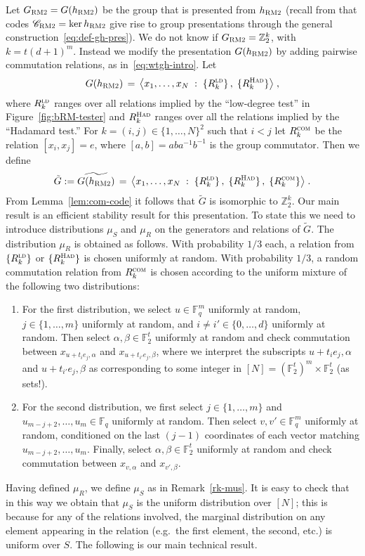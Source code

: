 \documentclass[11pt]{article}
\theoremstyle{definition}
\newcommand{\code}{\mathscr{C}}
\newcommand{\F}{\ensuremath{\mathbb{F}}}
\newcommand{\ld}{\textsc{ld}}
\newcommand{\com}{\textsc{com}}
\newcommand{\sq}{\textsc{sq}}
\newcommand{\Z}{\ensuremath{\mathbb{Z}}}
\newcommand{\bRM}{\ensuremath{\textsc{RM2}}}
\newcommand{\had}{\textsc{Had}}
\begin{document}
Let $G_\bRM = G(h_\bRM)$ be the group that is presented from $h_\bRM$ (recall from  that codes $\code_\bRM=\ker h_\bRM$ give rise to group presentations through the general construction~\eqref{eq:def-gh-pres}). We do not know if $G_\bRM = \Z_2^k$, with $k=t(d+1)^m$. Instead we modify the presentation $G(h_\bRM)$ by adding pairwise commutation relations, as in~\eqref{eq:wtgh-intro}. Let \tnote{Removed $\{R^\sq_k\}$ below following reviewer suggestion}
\[ G(h_\bRM) \,=\, \big\langle x_1,\ldots,x_N \;:\;  \{R^\ld_k\}\,,\; \{R^\had_{k}\} \big\rangle\;,\]
where  $R^\ld_k$ ranges over all relations implied by the ``low-degree test'' in Figure~\ref{fig:bRM-tester} and $R^\had_{k}$ ranges over all the relations implied by the ``Hadamard test.'' For $k=(i,j)\in\{1,\ldots,N\}^2$ such that $i<j$ let $R^\com_k$ be the relation $[x_i,x_j]=e$, where $[a,b]=aba^{-1}b^{-1}$ is the group commutator.
Then we define 
\begin{equation}\label{eq:z2k-eff}
\tilde{G}:=\widetilde{G(h_\bRM) } \,=\,\big\langle x_1,\ldots,x_N \;:\;  \{R^\ld_k\}\,,\; \{R^\had_{k}\}\, , \; \{ R^\com_k\}\big\rangle\;.
\end{equation}
From Lemma~\ref{lem:com-code} it follows that $\tilde{G}$ is isomorphic to $\Z_2^k$. Our main result is an efficient stability result for this presentation. To state this we need to introduce distributions $\mu_S$ and $\mu_R$ on the generators and relations of $\tilde{G}$. The distribution $\mu_R$ is obtained as follows. With probability $1/3$ each, a relation from $\{R^\ld_k\}$ or $\{R^\had_k\}$ is chosen uniformly at random. With probability $1/3$, a random commutation relation from $R^\com_k$ is chosen according to the uniform mixture of the following two distributions:
\begin{enumerate}
\item For the first distribution, we select $u\in \F_q^m$ uniformly at random, $j\in\{1,\ldots,m\}$ uniformly at random, and $i\neq i'\in\{0,\ldots,d\}$ uniformly at random. Then select $\alpha,\beta\in \F_2^t$ uniformly at random and check commutation between $x_{u+t_i e_j,\alpha}$ and $x_{u+t_{i'} e_j,\beta}$, where we interpret the subscripts  $u+t_i e_j,\alpha$ and $u+t_{i'} e_j,\beta$ as corresponding to some integer in $[N]= (\F_2^t)^m \times \F_2^t$ (as sets!). 

\item For the second distribution, we first select $j\in\{1,\ldots,m\}$ and $u_{m-j+2},\ldots,u_m \in \F_q$ uniformly at random. Then select $v,v' \in \F_q^m$ uniformly at random, conditioned on the last $(j-1)$ coordinates of each vector matching $u_{m-j+2},\ldots,u_m$. Finally, select $\alpha,\beta\in \F_2^t$ uniformly at random and check commutation between $x_{v,\alpha}$ and $x_{v',\beta}$. 
\end{enumerate}
Having defined $\mu_R$, we define $\mu_S$ as in Remark~\ref{rk-mus}. It is easy to check that in this way we obtain that $\mu_S$ is the uniform distribution over $[N] $; this is because for any of the relations involved, the marginal distribution on any element appearing in the relation (e.g.\ the first element, the second, etc.) is uniform over $S$. The following is our main technical result. 
\end{document}
